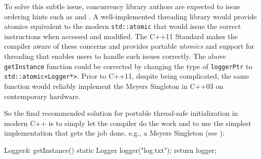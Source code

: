 To solve this subtle issue, concurrency library authors are expected to
issue ordering hints such as  and . A
well-implemented threading library would provide atomics equivalent to
the modern \lstinline!std::atomic! that would issue the correct
instructions when accessed and modified. The C++11 Standard makes the
compiler aware of these concerns and provides portable \emph{atomics}
and support for threading that enables users to handle such issues
correctly. The above \lstinline!getInstance! function could be corrected by
changing the type of \lstinline!loggerPtr! to
\lstinline!std::atomic<Logger*>!. Prior to C++11, despite being
complicated, the same function would reliably implement the Meyers
Singleton in C++03 on contemporary hardware.

\enlargethispage*{2ex} %
So the final recommended solution for portable thread-safe
initialization in modern C++ is to simply let the compiler do the work
and to use the simplest implementation that gets the job done, e.g., a
Meyers Singleton (see ):

\begin{emcppslisting}[emcppsbatch=e17]
Logger& getInstance()
{
    static Logger logger("log.txt");
    return logger;
}
\end{emcppslisting}


